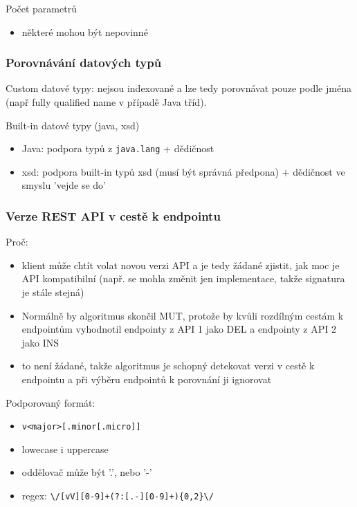 \documentclass[czech,DP]{thesiskiv}
\begin{document}
Počet parametrů
\begin{itemize}
	\item některé mohou být nepovinné
\end{itemize}
 
\subsubsection{Porovnávání datových typů}
Custom datové typy: nejsou indexované a lze tedy porovnávat pouze podle jména (např fully qualified name v případě Java tříd).
 
Built-in datové typy (java, xsd)

\begin{itemize}
	\item Java: podpora typů z \verb|java.lang| + dědičnost
	\item xsd: podpora built-in typů xsd (musí být správná předpona) + dědičnost ve smyslu 'vejde se do'
\end{itemize}

	
\subsubsection{Verze REST API v cestě k endpointu}	
\label{sec:api-path-version}

Proč: 

\begin{itemize}
	\item klient může chtít volat novou verzi API a je tedy žádané zjistit, jak moc je API kompatibilní (např. se mohla změnit jen implementace, takže signatura je stále stejná)
	
	\item Normálně by algoritmus skončil MUT, protože by kvůli rozdílným cestám k endpointům vyhodnotil endpointy z API 1 jako DEL a endpointy z API 2 jako INS
	
	\item to není žádané, takže algoritmus je schopný detekovat verzi v cestě k endpointu a při výběru endpointů k porovnání ji ignorovat
\end{itemize}

Podporovaný formát:
\begin{itemize}
	\item \verb|v<major>[.minor[.micro]]|
	\item lowecase i uppercase
	\item oddělovač může být '.', nebo '-'
	\item regex: \verb|\/[vV][0-9]+(?:[.-][0-9]+){0,2}\/|
\end{itemize}
\end{document}
